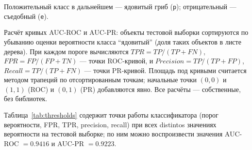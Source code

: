 \documentclass[12pt,a4paper]{article}
\begin{document}
Положительный класс в дальнейшем --- ядовитый гриб (\texttt{p}); отрицательный --- съедобный (\texttt{e}).

Расчёт кривых AUC-ROC и AUC-PR: объекты тестовой выборки сортируются по убыванию оценки вероятности класса ``ядовитый'' (доля таких объектов в листе дерева). При каждом пороге вычисляются $TPR = TP/(TP+FN)$, $FPR = FP/(FP+TN)$ --- точки ROC-кривой, и $Precision = TP/(TP+FP)$, $Recall = TP/(TP+FN)$ --- точки PR-кривой. Площадь под кривыми считается методом трапеций по отсортированным точкам; начальные точки $(0,0)$ и $(1,1)$ (ROC) и $(0,1)$ (PR) добавляются явно. Все расчёты --- собственные, без библиотек.

Таблица~\ref{tab:thresholds} содержит точки работы классификатора (порог вероятности, FPR, TPR, precision, recall) при всех distintos значениях вероятности на тестовой выборке; по ним можно воспроизвести значения AUC-ROC $= 0.9416$ и AUC-PR $= 0.9223$.
\end{document}
